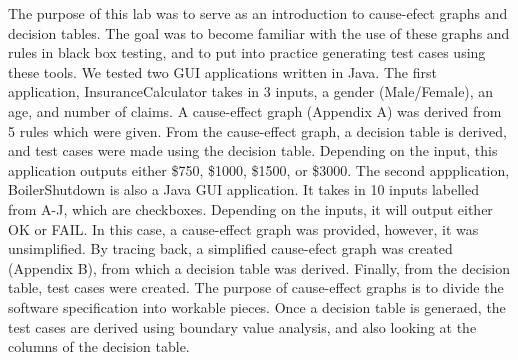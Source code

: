 The purpose of this lab was to serve as an introduction to cause-efect graphs
and decision tables. The goal was to become familiar with the use of these
graphs and rules in black box testing, and to put into practice generating test
cases using these tools. We tested two GUI applications written in Java.
The first application, InsuranceCalculator takes in 3 inputs, a gender
(Male/Female), an age, and number of claims. A cause-effect graph (Appendix A)
was derived from 5 rules which were given. From the cause-effect graph, a
decision table is derived, and test cases were made using the decision table.
Depending on the input, this application outputs either \$750, \$1000, \$1500,
or \$3000. The second appplication, BoilerShutdown is also a Java GUI
application. It takes in 10 inputs labelled from A-J, which are checkboxes.
Depending on the inputs, it will output either OK or FAIL. In this case, a
cause-effect graph was provided, however, it was unsimplified. By tracing back,
a simplified cause-efect graph was created (Appendix B), from which a decision
table was derived. Finally, from the decision table, test cases were created.
The purpose of cause-effect graphs is to divide the software specification into
workable pieces. Once a decision table is generaed, the test cases are derived
using boundary value analysis, and also looking at the columns of the decision
table. 
